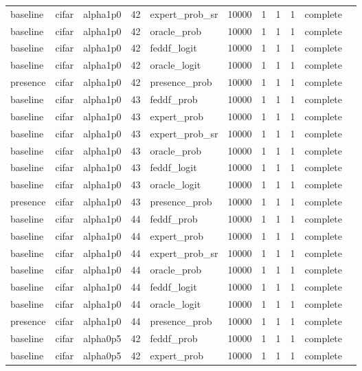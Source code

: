 \begin{tabular}{lllrlrrrrll}
baseline & cifar & alpha1p0 & 42 & expert\_prob\_sr & 10000 & 1 & 1 & 1 & complete &  \\
baseline & cifar & alpha1p0 & 42 & oracle\_prob & 10000 & 1 & 1 & 1 & complete &  \\
baseline & cifar & alpha1p0 & 42 & feddf\_logit & 10000 & 1 & 1 & 1 & complete &  \\
baseline & cifar & alpha1p0 & 42 & oracle\_logit & 10000 & 1 & 1 & 1 & complete &  \\
presence & cifar & alpha1p0 & 42 & presence\_prob & 10000 & 1 & 1 & 1 & complete &  \\
baseline & cifar & alpha1p0 & 43 & feddf\_prob & 10000 & 1 & 1 & 1 & complete &  \\
baseline & cifar & alpha1p0 & 43 & expert\_prob & 10000 & 1 & 1 & 1 & complete &  \\
baseline & cifar & alpha1p0 & 43 & expert\_prob\_sr & 10000 & 1 & 1 & 1 & complete &  \\
baseline & cifar & alpha1p0 & 43 & oracle\_prob & 10000 & 1 & 1 & 1 & complete &  \\
baseline & cifar & alpha1p0 & 43 & feddf\_logit & 10000 & 1 & 1 & 1 & complete &  \\
baseline & cifar & alpha1p0 & 43 & oracle\_logit & 10000 & 1 & 1 & 1 & complete &  \\
presence & cifar & alpha1p0 & 43 & presence\_prob & 10000 & 1 & 1 & 1 & complete &  \\
baseline & cifar & alpha1p0 & 44 & feddf\_prob & 10000 & 1 & 1 & 1 & complete &  \\
baseline & cifar & alpha1p0 & 44 & expert\_prob & 10000 & 1 & 1 & 1 & complete &  \\
baseline & cifar & alpha1p0 & 44 & expert\_prob\_sr & 10000 & 1 & 1 & 1 & complete &  \\
baseline & cifar & alpha1p0 & 44 & oracle\_prob & 10000 & 1 & 1 & 1 & complete &  \\
baseline & cifar & alpha1p0 & 44 & feddf\_logit & 10000 & 1 & 1 & 1 & complete &  \\
baseline & cifar & alpha1p0 & 44 & oracle\_logit & 10000 & 1 & 1 & 1 & complete &  \\
presence & cifar & alpha1p0 & 44 & presence\_prob & 10000 & 1 & 1 & 1 & complete &  \\
baseline & cifar & alpha0p5 & 42 & feddf\_prob & 10000 & 1 & 1 & 1 & complete &  \\
baseline & cifar & alpha0p5 & 42 & expert\_prob & 10000 & 1 & 1 & 1 & complete &  \\

\end{tabular}
